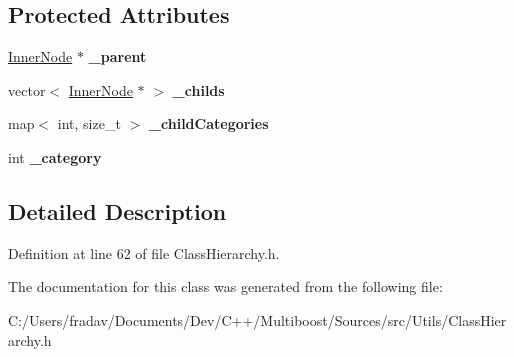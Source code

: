 \subsection*{Protected Attributes}
\begin{DoxyCompactItemize}
\item 
\hypertarget{classMultiBoost_1_1InnerNode_a06c591991fcf03078b8b07e12e35eaa8}{\hyperlink{classMultiBoost_1_1InnerNode}{Inner\-Node} $\ast$ {\bfseries \-\_\-parent}}\label{classMultiBoost_1_1InnerNode_a06c591991fcf03078b8b07e12e35eaa8}

\item 
\hypertarget{classMultiBoost_1_1InnerNode_a80e1e6aec8cd6e011009fa1fc0fe78f3}{vector$<$ \hyperlink{classMultiBoost_1_1InnerNode}{Inner\-Node} $\ast$ $>$ {\bfseries \-\_\-childs}}\label{classMultiBoost_1_1InnerNode_a80e1e6aec8cd6e011009fa1fc0fe78f3}

\item 
\hypertarget{classMultiBoost_1_1InnerNode_a185de51c3ca24abc6bd57c4874d29852}{map$<$ int, size\-\_\-t $>$ {\bfseries \-\_\-child\-Categories}}\label{classMultiBoost_1_1InnerNode_a185de51c3ca24abc6bd57c4874d29852}

\item 
\hypertarget{classMultiBoost_1_1InnerNode_afa888f1ab3d7e57a68b8a6b4f38ebd47}{int {\bfseries \-\_\-category}}\label{classMultiBoost_1_1InnerNode_afa888f1ab3d7e57a68b8a6b4f38ebd47}

\end{DoxyCompactItemize}


\subsection{Detailed Description}


Definition at line 62 of file Class\-Hierarchy.\-h.



The documentation for this class was generated from the following file\-:\begin{DoxyCompactItemize}
\item 
C\-:/\-Users/fradav/\-Documents/\-Dev/\-C++/\-Multiboost/\-Sources/src/\-Utils/Class\-Hierarchy.\-h\end{DoxyCompactItemize}
